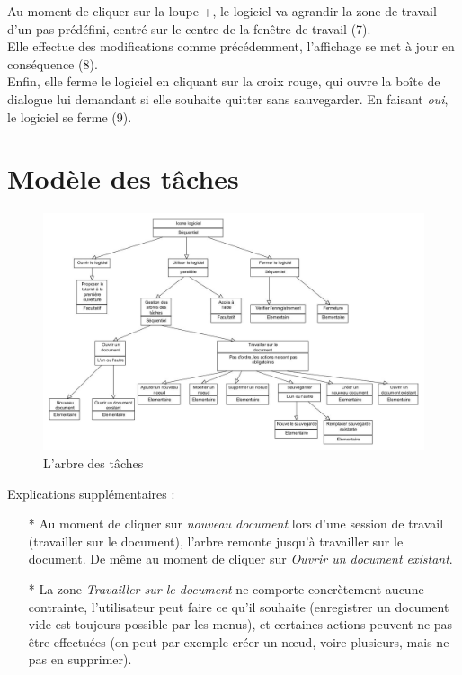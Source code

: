\documentclass[12pt, a4paper]{article}
\begin{document}
Au moment de cliquer sur la loupe +, le logiciel va agrandir la zone de travail d'un pas prédéfini, centré sur le centre de la fenêtre de travail (7).\\


Elle effectue des modifications comme précédemment, l'affichage se met à jour en conséquence (8).\\


Enfin, elle ferme le logiciel en cliquant sur la croix rouge, qui ouvre la boîte de dialogue lui demandant si elle souhaite quitter sans sauvegarder. En faisant \emph{oui}, le logiciel se ferme (9).

\section{Modèle des tâches}

\begin{figure}[h]
\begin{center}
   \includegraphics[scale = 0.4]{arbre-des-taches.jpg}
	\caption{L'arbre des tâches}
	\end{center}
\end{figure}


Explications supplémentaires : 
\begin{itemize}
\item [*]Au moment de cliquer sur \emph{nouveau document} lors d'une session de travail (travailler sur le document), l'arbre remonte jusqu'à travailler sur le document. De même au moment de cliquer sur \emph{Ouvrir un document existant}.
\item [*]La zone \emph{Travailler sur le document} ne comporte concrètement aucune contrainte, l'utilisateur peut faire ce qu'il souhaite (enregistrer un document vide est toujours possible par les menus), et certaines actions peuvent ne pas être effectuées (on peut par exemple créer un nœud, voire plusieurs, mais ne pas en supprimer).
\end{itemize}
\end{document}
